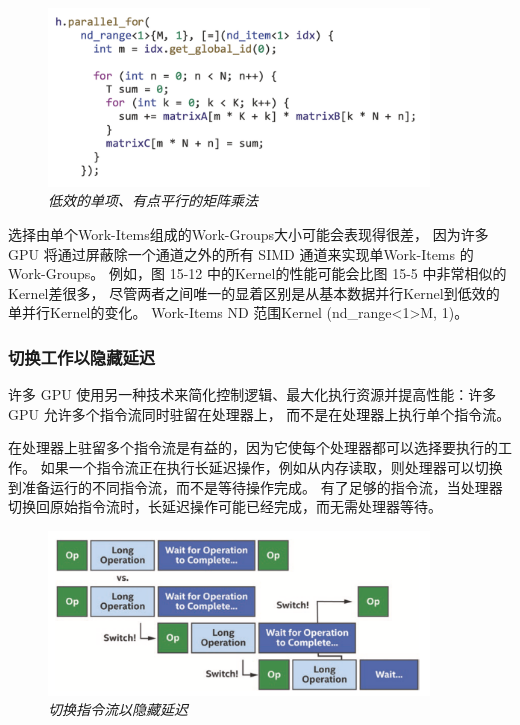 \begin{figure}[H]
	\centering
	\includegraphics[width=0.9\textwidth]{figs/F15.12.png}
	\caption{\textit{低效的单项、有点平行的矩阵乘法 }}
\end{figure}

选择由单个Work-Items组成的Work-Groups大小可能会表现得很差，
因为许多 GPU 将通过屏蔽除一个通道之外的所有 SIMD 通道来实现单Work-Items 的 Work-Groups。 
例如，图 15-12 中的Kernel的性能可能会比图 15-5 中非常相似的Kernel差很多，
尽管两者之间唯一的显着区别是从基本数据并行Kernel到低效的单并行Kernel的变化。 
Work-Items ND 范围Kernel (nd\_range<1>{M, 1})。

\subsubsection{切换工作以隐藏延迟}
许多 GPU 使用另一种技术来简化控制逻辑、最大化执行资源并提高性能：许多 GPU 允许多个指令流同时驻留在处理器上，
而不是在处理器上执行单个指令流。

在处理器上驻留多个指令流是有益的，因为它使每个处理器都可以选择要执行的工作。 
如果一个指令流正在执行长延迟操作，例如从内存读取，则处理器可以切换到准备运行的不同指令流，而不是等待操作完成。 
有了足够的指令流，当处理器切换回原始指令流时，长延迟操作可能已经完成，而无需处理器等待。

\begin{figure}[H]
	\centering
	\includegraphics[width=0.9\textwidth]{figs/F15.13.png}
	\caption{\textit{切换指令流以隐藏延迟 }}
\end{figure}

